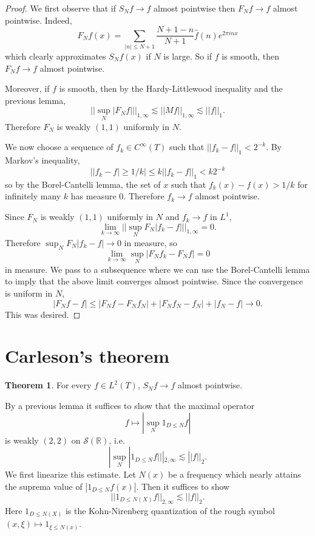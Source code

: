 \documentclass[12pt]{report}
\newcommand{\RR}{\mathbb{R}}
\newcommand{\Sch}{\mathcal{S}}
\theoremstyle{definition}
\newtheorem{theorem}{Theorem}[chapter]
\begin{document}
\begin{proof}
We first observe that if $S_Nf \to f$ almost pointwise then $F_Nf \to f$ almost pointwise. Indeed,
$$F_Nf(x) = \sum_{|n| \leq N+1}\frac{N+1-n}{N+1} \hat f(n)e^{2\pi inx}$$
which clearly approximates $S_Nf(x)$ if $N$ is large.
So if $f$ is smooth, then $F_Nf \to f$ almost pointwise.

Moreover, if $f$ is smooth, then by the Hardy-Littlewood inequality and the previous lemma,
$$||\sup_N |F_Nf|||_{1, \infty} \lesssim ||Mf||_{1, \infty} \lesssim ||f||_1.$$
Therefore $F_N$ is weakly $(1, 1)$ uniformly in $N$.

We now choose a sequence of $f_k \in C^\infty(T)$ such that $||f_k - f||_1 < 2^{-k}$.
By Markov's inequality,
$$||f_k - f| \geq 1/k| \leq k ||f_k - f||_1 < k 2^{-k}$$
so by the Borel-Cantelli lemma, the set of $x$ such that $f_k(x) - f(x) > 1/k$ for infinitely many $k$ has measure $0$.
Therefore $f_k \to f$ almost pointwise.

Since $F_N$ is weakly $(1, 1)$ uniformly in $N$ and $f_k \to f$ in $L^1$,
$$\lim_{k \to \infty} ||\sup_N F_N|f_k - f|||_{1, \infty} = 0.$$
Therefore $\sup_NF_N|f_k - f| \to 0$ in measure, so
$$\lim_{k \to \infty} \sup_N |F_N f_k - F_N f| = 0$$
in measure. We pass to a subsequence where we can use the Borel-Cantelli lemma to imply that the above limit converges almost pointwise.
Since the convergence is uniform in $N$,
$$|F_Nf - f| \leq |F_Nf - F_Nf_N| + |F_Nf_N - f_N| + |f_N - f| \to 0.$$
This was desired.
\end{proof}

\section{Carleson's theorem}
\begin{theorem}
For every $f \in L^2(T)$, $S_Nf \to f$ almost pointwise.
\end{theorem}
By a previous lemma it suffices to show that the maximal operator
$$f \mapsto |\sup_N 1_{D \leq N} f|$$
is weakly $(2, 2)$ on $\Sch(\RR)$, i.e.
$$|\sup_N |1_{D \leq N} f|||_{2, \infty} \lesssim ||f||_2.$$
We first linearize this estimate.
Let $N(x)$ be a frequency which nearly attains the suprema value of $|1_{D \leq N} f(x)|$. Then it suffices to show
$$||1_{D \leq N(X)}f||_{2, \infty} \lesssim ||f||_2.$$
Here $1_{D \leq N(X)}$ is the Kohn-Nirenberg quantization of the rough symbol $(x, \xi) \mapsto 1_{\xi \leq N(x)}$.
\end{document}
